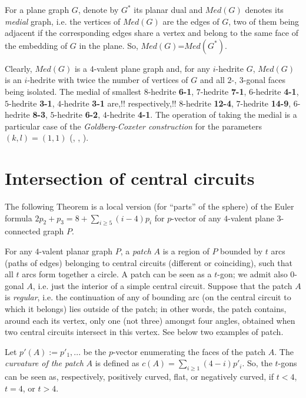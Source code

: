 \documentclass[12pt]{article}
\begin{document}
For a plane graph $G$, denote by $G^*$ its planar dual and {\em $Med(G)$} 
denotes its {\em medial} graph, i.e. the vertices of $Med(G)$ are the edges of 
$G$, two of them being adjacent if the corresponding edges share a vertex and 
belong to the same face of the embedding of $G$ in the plane. 
So, $Med(G)$=$Med(G^*)$.

Clearly, $Med(G)$ is a $4$-valent plane graph and, for any $i$-hedrite $G$,
$Med(G)$ is an $i$-hedrite with twice the number of vertices of $G$ and
all $2$-, $3$-gonal faces being isolated. The medial of smallest
$8$-hedrite {\bf 6-1}, $7$-hedrite {\bf 7-1}, $6$-hedrite {\bf 4-1},
$5$-hedrite {\bf 3-1}, $4$-hedrite {\bf 3-1} are,!! respectively,!! $8$-hedrite
{\bf 12-4}, $7$-hedrite {\bf 14-9}, $6$-hedrite {\bf 8-3},
$5$-hedrite {\bf 6-2}, $4$-hedrite {\bf 4-1}.
The operation of taking the medial is a particular case of the {\em Goldberg-Coxeter construction} for the parameters $(k,l)=(1,1)$ (\cite{Gold37}, \cite{Cox71}, \cite{DD03}).





\section{Intersection of central circuits}

The following Theorem is a local version (for ``parts'' of the sphere) of
the Euler formula
$2p_2+p_3=8+ \sum_{i\geq 5} (i-4)p_i$ for $p$-vector of any $4$-valent 
plane $3$-connected graph $P$.

For any $4$-valent planar graph $P$, a {\em patch} $A$ is a region of $P$
bounded by $t$ arcs (paths of edges) belonging to central circuits 
(different or coinciding), such that all $t$ arcs form together a circle. 
A patch can be seen as a $t$-gon; we admit also 
$0$-gonal $A$, i.e. just the interior of a simple central circuit. 
Suppose that the patch $A$ is {\em regular}, i.e.
the continuation of any of bounding arc (on the central circuit to which it
belongs) lies outside of the patch; in other words, the patch
contains, around each its vertex, only one (not three) amongst four angles, 
obtained when two central circuits intersect in this vertex.  See below two 
examples of patch.

\begin{center}
\epsfxsize=60mm
\end{center}

Let $p'(A):=p'_1,...$ be the $p$-vector enumerating the faces of the 
patch $A$. The {\em curvature of the patch} $A$ is defined as
$c(A)=\sum_{i\geq 1} (4-i)p'_i$. So, the $t$-gons can be seen as,
respectively, positively curved, flat, or negatively curved, if
$t<4$, $t=4$, or $t>4$.
\end{document}
